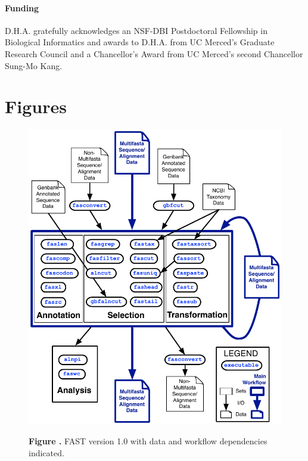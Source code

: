 \documentclass{frontiersSCNS} %
\begin{document}
\paragraph{Funding\textcolon} D.H.A. gratefully acknowledges an NSF-DBI
Postdoctoral Fellowship in Biological Informatics and awards to
D.H.A. from UC Merced's Graduate Research Council and a Chancellor's
Award from UC Merced's second Chancellor Sung-Mo Kang.



\section*{Figures}

\begin{figure}
\begin{center}
\includegraphics[width=4.5in]{FAST_v8}%
\end{center}
 \textbf{\label{fig:01} Figure
   .}{ FAST version 1.0 with data and workflow
   dependencies indicated.}
\end{figure}
\end{document}
